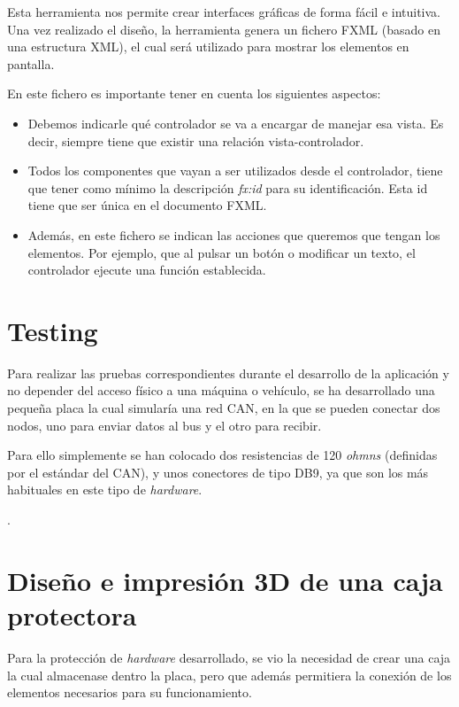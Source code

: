 Esta herramienta nos permite crear interfaces gráficas de forma fácil e intuitiva. Una vez realizado el diseño, la herramienta genera un fichero FXML (basado en una estructura XML), el cual será utilizado para mostrar los elementos en pantalla.

En este fichero es importante tener en cuenta los siguientes aspectos:

\begin{itemize}

\item
Debemos indicarle qué controlador se va a encargar de manejar esa vista. Es decir, siempre tiene que existir una relación vista-controlador.
\item
Todos los componentes que vayan a ser utilizados desde el controlador, tiene que tener como mínimo la descripción \emph{fx:id} para su identificación. Esta id tiene que ser única en el documento FXML.
\item
Además, en este fichero se indican las acciones que queremos que tengan los elementos. Por ejemplo, que al pulsar un botón o modificar un texto, el controlador ejecute una función establecida.

\end{itemize}


\section{Testing}\label{testing}

Para realizar las pruebas correspondientes durante el desarrollo de la aplicación y no depender del acceso físico a una máquina o vehículo, se ha desarrollado una pequeña placa la cual simularía una red CAN, en la que se pueden conectar dos nodos, uno para enviar datos al bus y el otro para recibir.

Para ello simplemente se han colocado dos resistencias de 120 \emph{ohmns} (definidas por el estándar del CAN), y unos conectores de tipo DB9, ya que son los más habituales en este tipo de \emph{hardware}.

.

\section{Diseño e impresión 3D de una caja protectora}\label{desarrollo_e_impresion_3d_de_una_caja_protectora}

Para la protección de \emph{hardware} desarrollado, se vio la necesidad de crear una caja la cual almacenase dentro la placa, pero que además permitiera la conexión de los elementos necesarios para su funcionamiento.

